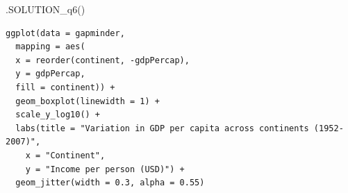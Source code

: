 \documentclass[
  letterpaper,
  DIV=11,
  numbers=noendperiod]{scrreprt}
\newenvironment{Shaded}{\begin{snugshade}}{\end{snugshade}}
\newcommand{\FunctionTok}[1]{\textcolor[rgb]{0.28,0.35,0.67}{#1}}
\newcommand{\NormalTok}[1]{\textcolor[rgb]{0.00,0.23,0.31}{#1}}
\begin{document}
\begin{Shaded}
\begin{Highlighting}[]
\FunctionTok{.SOLUTION\_q6}\NormalTok{()}
\end{Highlighting}
\end{Shaded}

\begin{verbatim}
ggplot(data = gapminder,
  mapping = aes(
  x = reorder(continent, -gdpPercap), 
  y = gdpPercap, 
  fill = continent)) +
  geom_boxplot(linewidth = 1) +
  scale_y_log10() +
  labs(title = "Variation in GDP per capita across continents (1952-2007)",
    x = "Continent",
    y = "Income per person (USD)") + 
  geom_jitter(width = 0.3, alpha = 0.55)
\end{verbatim}
\end{document}
